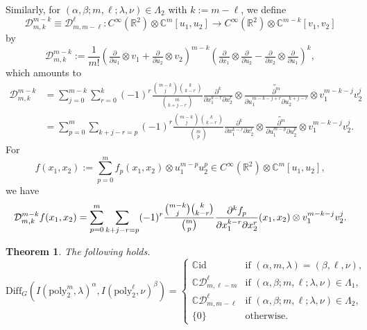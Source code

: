 \documentclass[reqno,11pt]{amsart}
\newtheorem{thm}[equation]{Theorem}
\theoremstyle{remark}
\numberwithin{equation}{section}
\newcommand{\gb}{\beta}
\newcommand{\ga}{\alpha}
\newcommand{\gL}{\Lambda}
\newcommand{\R}{\mathbb{R}}
\newcommand{\C}{\mathbb{C}}
\newcommand{\Cal}{\mathcal}
\newcommand{\poly}{\mathrm{poly}}
\newcommand{\To}{\longrightarrow}
\newcommand{\Diff}{\mathrm{Diff}}
\newcommand{\id}{\mathrm{id}}
\begin{document}
Similarly, for $(\ga, \gb; m, \ell; \lambda,\nu) \in \gL_2$ with $k:=m-\ell$,
we define
\begin{equation*}
\Cal{D}^{m-k}_{m,k} \equiv \Cal{D}_{m,m-\ell}^{\ell} \colon C^\infty(\R^2)\otimes \C^m[u_1, u_2]
\To
C^\infty(\R^2)\otimes \C^{m-k}[v_1, v_2]
\end{equation*}
by
\begin{equation}\label{eqn:IDO2}
\Cal{D}^{m-k}_{m,k} :=
\frac{1}{m!}
\left(\tfrac{\partial}{\partial u_1}\otimes v_1 + \tfrac{\partial}{\partial u_2}\otimes v_2\right)^{m-k}
\left(\tfrac{\partial}{\partial x_1}\otimes \tfrac{\partial}{\partial u_2} - \tfrac{\partial}{\partial x_2}\otimes \tfrac{\partial}{\partial u_1}\right)^k,
\end{equation}
which amounts to
\begin{align*}
\Cal{D}^{m-k}_{m,k}
&=
\sum_{j=0}^{m-k}\sum_{r=0}^k
(-1)^r
\frac{\binom{m-k}{j}\binom{k}{k-r}}{\binom{m}{k+j-r}}
\frac{\partial^k}{\partial x_1^{k-r} \partial x_2^r}
\otimes
\widetilde{\frac{\partial^m}{\partial u_1^{m-k-j+r}\partial u_2^{k+j-r}}} 
\otimes v_1^{m-k-j}v_2^{j}\\[3pt]
&=
\sum_{p=0}^{m}\sum_{k+j-r=p}
(-1)^r
\frac{\binom{m-k}{j}\binom{k}{k-r}}{\binom{m}{p}}
\frac{\partial^k}{\partial x_1^{k-r} \partial x_2^r}
\otimes
\widetilde{\frac{\partial^m}{\partial u_1^{m-p}\partial u_2^{p}}} 
\otimes v_1^{m-k-j}v_2^{j}.
\end{align*}
For 
\begin{equation*}
f(x_1, x_2) 
:= \sum_{p=0}^m f_p(x_1,x_2) 
\otimes u_1^{m-p}u_2^p \in C^\infty(\R^2)\otimes \C^m[u_1, u_2], 
\end{equation*}
we have
\begin{equation*}
\Cal{D}^{m-k}_{m,k}f(x_1, x_2) = 
\sum_{p=0}^{m}\sum_{k+j-r=p}
(-1)^r
\frac{\binom{m-k}{j}\binom{k}{k-r}}{\binom{m}{p}}
\frac{\partial^kf_p}{\partial x_1^{k-r} \partial x_2^r}(x_1,x_2)
\otimes v_1^{m-k-j}v_2^{j}.\\[3pt]
\end{equation*}



\begin{thm}\label{thm:IDO2}
The following holds.
\begin{equation*}
\Diff_G(I(\poly_2^m, \lambda)^\ga, I(\poly_2^\ell,  \nu)^\beta)
=
\begin{cases}
\C\id & \text{if $(\ga, m, \lambda) = (\gb, \ell, \nu)$},\\[3pt]
\C\Cal{D}_{m,\ell-m}^{\ell} &\text{if $(\ga, \gb; m,\ell ; \lambda, \nu) \in \gL_1$},\\[3pt]
\C\Cal{D}_{m,m-\ell}^{\ell} &\text{if $(\ga, \gb; m,\ell ; \lambda, \nu) \in \gL_2$},\\
\{0\} &\text{otherwise}.
\end{cases}
\end{equation*}
\end{thm}
\end{document}
